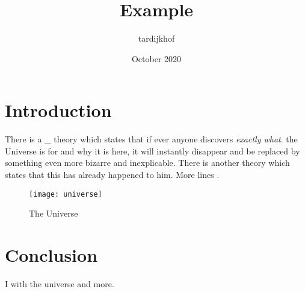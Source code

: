 \documentclass{article}
\title{Example}
\author{tardijkhof}
\date{October 2020}
\begin{document}
\maketitle

\section{Introduction}\label{sec:multi-sided-plm}
There is a \_ theory which states that if ever anyone discovers \textit{exactly what}. the Universe is for and why it is here, it will instantly disappear and be replaced by something even more bizarre and inexplicable.
There is another theory which states that this has already happened to him. More lines \cite{me}.

\begin{figure}[h!]
\centering
\texttt{[image: universe]}
\caption{The Universe}
\label{fig:universe}
\end{figure}

\section{Conclusion}
I with the universe \cite{tadst} and more.



\end{document}
